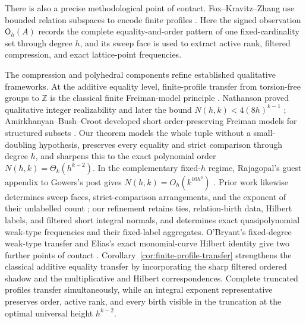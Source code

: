 \documentclass[11pt,reqno]{amsart}
\theoremstyle{definition}
\theoremstyle{remark}
\begin{document}
There is also a precise methodological point of contact.
Fox--Kravitz--Zhang use bounded relation subspaces to encode finite profiles
\cite[Lemma~8]{FoxKravitzZhang2026}.  Here the signed observation $\mathsf O_h(A)$
records the complete equality-and-order pattern of one fixed-cardinality set
through degree $h$, and its sweep face is used to extract active rank, filtered
compression, and exact lattice-point frequencies.

The compression and polyhedral components refine established qualitative
frameworks.  At the additive equality level, finite-profile transfer from
torsion-free groups to $\mathbb Z$ is the classical finite Freiman-model
principle \cite[Part~II, Lemma~2.3.4]{GeroldingerRuzsa2009}.  Nathanson proved
qualitative integer realizability \cite{NathansonMSTD2018} and later the bound
$N(h,k)<4(8h)^{k-1}$ \cite{NathansonCompression};
Amirkhanyan--Bush--Croot developed short order-preserving Freiman models for
structured subsets \cite{AmirkhanyanBushCroot2018}.  Our
theorem models the whole tuple without a small-doubling hypothesis, preserves
every equality and strict comparison through degree $h$, and sharpens this to
the exact polynomial order $N(h,k)=\Theta_k(h^{k-2})$.  In the complementary
fixed-$h$ regime, Rajagopal's guest appendix to Gowers's post gives
$N(h,k)=O_h(k^{10h^3})$ \cite{GowersRajagopal2026}.  Prior work likewise
determines sweep faces, strict-comparison arrangements, and the exponent of
their unlabelled count
\cite{PadrolPhilippe2024,Vietri2002,BaranyBureauxLund2018}; our refinement
retains ties, relation-birth data, Hilbert labels, and filtered short integral
normals, and determines exact quasipolynomial weak-type frequencies and their
fixed-label aggregates.
O'Bryant's fixed-degree weak-type transfer and Elias's exact monomial-curve
Hilbert identity give two further points of contact
\cite{OBryant2025,Elias2022}.  Corollary~\ref{cor:finite-profile-transfer}
strengthens the classical additive equality transfer by incorporating the
sharp filtered ordered shadow and the multiplicative and Hilbert
correspondences.  Complete truncated profiles transfer simultaneously,
while an integral exponent representative preserves order, active rank, and
every birth visible in the truncation at the optimal universal height
$h^{k-2}$.
\end{document}
